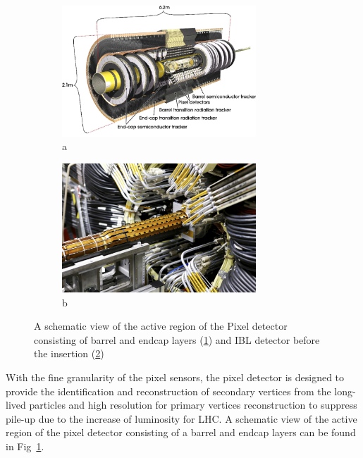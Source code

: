 \begin{figure}
\begin{subfigure}{.5\textwidth}
  \centering
    \includegraphics[width=0.8\textwidth]{chapters/c4/figures/pixel}
  \caption{a}
  \label{fig:pixel1}
\end{subfigure}%
\begin{subfigure}{.5\textwidth}
  \centering
    \includegraphics[width=0.8\textwidth]{chapters/c4/figures/IBL}
  \caption{b}
  \label{fig:pixel2}
\end{subfigure}
    \caption{A schematic view of the active region of the Pixel detector consisting of barrel and endcap layers (\ref{fig:pixel1}) and IBL detector before the insertion (\ref{fig:pixel2})}
\label{fig:pixel}
\end{figure}
\par  With the fine granularity of the pixel sensors, the pixel detector is designed to provide the identification and reconstruction of secondary vertices from the long-lived particles and high resolution for primary vertices reconstruction to suppress pile-up due to the increase of luminosity for LHC. A schematic view of the active region of the pixel detector consisting of a barrel and endcap layers can be found in Fig~\ref{fig:pixel1}.
